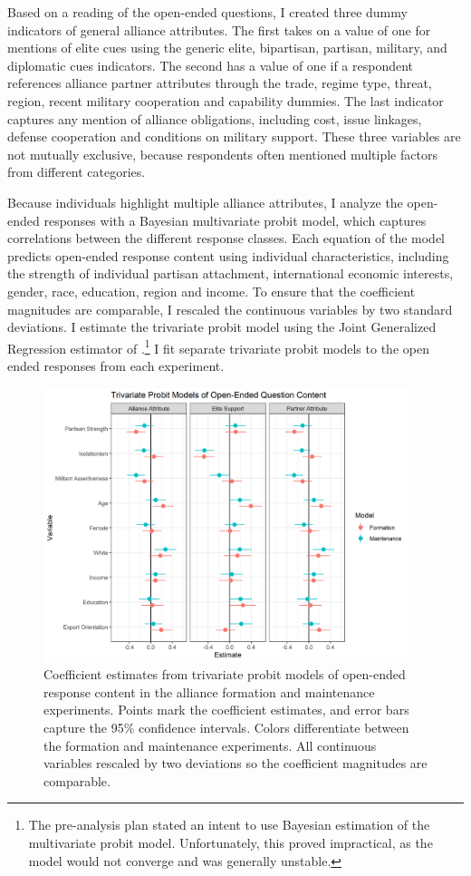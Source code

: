 \documentclass[12pt]{article}
\begin{document}
Based on a reading of the open-ended questions, I created three dummy indicators of general alliance attributes. 
The first takes on a value of one for mentions of elite cues using the generic elite, bipartisan, partisan, military, and diplomatic cues indicators. 
The second has a value of one if a respondent references alliance partner attributes through the trade, regime type, threat, region, recent military cooperation and capability dummies. 
The last indicator captures any mention of alliance obligations, including cost, issue linkages, defense cooperation and conditions on military support. 
These three variables are not mutually exclusive, because respondents often mentioned multiple factors from different categories. 


Because individuals highlight multiple alliance attributes, I analyze the open-ended responses with a Bayesian multivariate probit model, which captures correlations between the different response classes. 
Each equation of the model predicts open-ended response content using individual characteristics, including the strength of individual partisan attachment, international economic interests, gender, race, education, region and income. 
To ensure that the coefficient magnitudes are comparable, I rescaled the continuous variables by two standard deviations. 
I estimate the trivariate probit model using the Joint Generalized Regression estimator of \citet{Braumoelleretal2018}.\footnote{The pre-analysis plan stated an intent to use Bayesian estimation of the multivariate probit model. Unfortunately, this proved impractical, as the model would not converge and was generally unstable.} 
I fit separate trivariate probit models to the open ended responses from each experiment. 


\begin{figure}
	\centering
		\includegraphics[width=0.95\textwidth]{open-questions-res.png}
	\caption{Coefficient estimates from trivariate probit models of open-ended response content in the alliance formation and maintenance experiments. Points mark the coefficient estimates, and error bars capture the 95\% confidence intervals. Colors differentiate between the formation and maintenance experiments. All continuous variables rescaled by two deviations so the coefficient magnitudes are comparable.}
	\label{fig:openq-res}
\end{figure}
\end{document}
